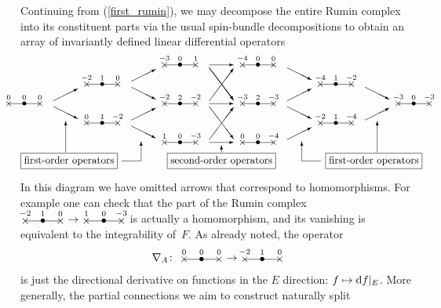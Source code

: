 \documentclass[10pt,a4paper]{amsart}
\numberwithin{equation}{section}
\newcommand{\xox}[3]{\begin{picture}(40,11)
\put(4,1.5){\makebox(0,0){$\times$}}
\put(20,1.5){\makebox(0,0){$\bullet$}}
\put(36,1.5){\makebox(0,0){$\times$}}
\put(4,1.5){\line(1,0){32}}
\put(4,8){\makebox(0,0){$\scriptstyle #1$}}
\put(20,8){\makebox(0,0){$\scriptstyle #2$}}
\put(36,8){\makebox(0,0){$\scriptstyle #3$}}
\end{picture}}
\begin{document}
Continuing from (\ref{first_rumin}), we may decompose the entire Rumin complex
into its constituent parts via the usual spin-bundle decompositions to obtain
an array of invariantly defined linear differential operators
\begin{gather}\label{array_of_operators}
\raisebox{-40pt}{\setlength{\unitlength}{.95pt}
\begin{picture}(410,120)(0,-25)
\put(0,50){\makebox(0,0){\xox{0}{0}{0}}}
\put(80,70){\makebox(0,0){\xox{-2}{1}{0}}}
\put(80,30){\makebox(0,0){\xox{0}{1}{-2}}}
\put(160,90){\makebox(0,0){\xox{-3}{0}{1}}}
\put(160,50){\makebox(0,0){\xox{-2}{2}{-2}}}
\put(160,10){\makebox(0,0){\xox{1}{0}{-3}}}
\put(240,90){\makebox(0,0){\xox{-4}{0}{0}}}
\put(240,50){\makebox(0,0){\xox{-3}{2}{-3}}}
\put(240,10){\makebox(0,0){\xox{0}{0}{-4}}}
\put(320,70){\makebox(0,0){\xox{-4}{1}{-2}}}
\put(320,30){\makebox(0,0){\xox{-2}{1}{-4}}}
\put(400,50){\makebox(0,0){\xox{-3}{0}{-3}}}
\put(30,49){\vector(2,1){25}}
\put(30,43){\vector(2,-1){25}}
\put(110,69){\vector(2,1){25}}
\put(110,63){\vector(2,-1){25}}
\put(110,29){\vector(2,1){25}}
\put(110,23){\vector(2,-1){25}}
\put(190,86){\vector(1,0){25}}
\put(190,46){\vector(1,0){25}}
\put(190,6){\vector(1,0){25}}
\put(190,83){\vector(3,-4){25}}
\put(190,83){\vector(3,-4){25}}
\put(190,49){\vector(3,4){25}}
\put(190,43){\vector(3,-4){25}}
\put(190,9){\vector(3,4){25}}
\put(270,83){\vector(2,-1){25}}
\put(270,49){\vector(2,1){25}}
\put(270,43){\vector(2,-1){25}}
\put(270,9){\vector(2,1){25}}
\put(350,63){\vector(2,-1){25}}
\put(350,29){\vector(2,1){25}}
\put(202.5,-13){\makebox(0,0){\framebox{second-order operators}}}
\put(202.5,-4){\vector(0,1){7}}
\put(46,-13){\makebox(0,0){\framebox{first-order operators}}}
\put(42.5,-4){\vector(0,1){32}}
\put(100,-13){\line(1,0){20}}
\put(120,-13){\vector(0,1){20}}
\put(359,-13){\makebox(0,0){\framebox{first-order operators}}}
\put(362.5,-4){\vector(0,1){32}}
\put(305,-13){\line(-1,0){20}}
\put(285,-13){\vector(0,1){20}}
\end{picture}}\!\!\!\!\!
\end{gather}
In this diagram we have omitted arrows that correspond to homomorphisms. For
example one can check that the part of the Rumin complex
$\xox{-2}{1}{0}\to\xox{1}{0}{-3}$ is actually a homomorphism, and its vanishing
is equivalent to the integrability of~$F$. As already noted, the operator
\[\nabla_A\colon \ \xox{0}{0}{0}\to\xox{-2}{1}{0}\]
is just the directional derivative on functions in the $E$ direction:
$f \mapsto {\rm d}f|_E$.
More generally, the partial connections we aim to construct naturally split
\end{document}
